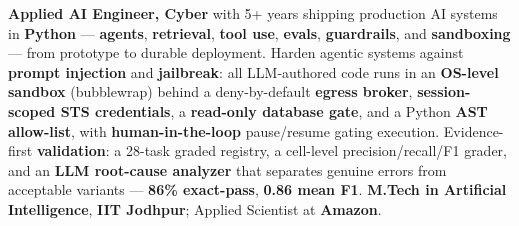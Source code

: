 \documentclass[letter,10pt]{article}
\begin{document}

\textbf{Applied AI Engineer, Cyber} with 5+ years shipping production AI systems in \textbf{Python} --- \textbf{agents}, \textbf{retrieval}, \textbf{tool use}, \textbf{evals}, \textbf{guardrails}, and \textbf{sandboxing} --- from prototype to durable deployment.
Harden agentic systems against \textbf{prompt injection} and \textbf{jailbreak}: all LLM-authored code runs in an \textbf{OS-level sandbox} (bubblewrap) behind a deny-by-default \textbf{egress broker}, \textbf{session-scoped STS credentials}, a \textbf{read-only database gate}, and a Python \textbf{AST allow-list}, with \textbf{human-in-the-loop} pause/resume gating execution.
Evidence-first \textbf{validation}: a 28-task graded registry, a cell-level precision/recall/F1 grader, and an \textbf{LLM root-cause analyzer} that separates genuine errors from acceptable variants --- \textbf{86\% exact-pass}, \textbf{0.86 mean F1}.
\textbf{M.Tech in Artificial Intelligence}, \textbf{IIT Jodhpur}; Applied Scientist at \textbf{Amazon}.
\end{document}
